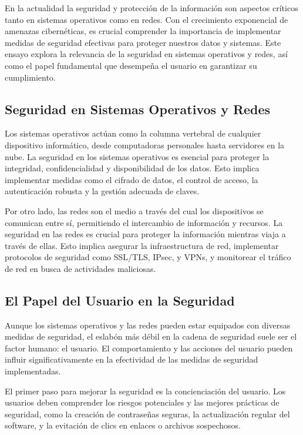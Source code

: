 \documentclass[12pt, a4paper]{article} %
\begin{document}
En la actualidad la seguridad y protección de la información son aspectos críticos tanto en sistemas operativos como en redes. Con el crecimiento exponencial de amenazas cibernéticas, es crucial comprender la importancia de implementar medidas de seguridad efectivas para proteger nuestros datos y sistemas. Este ensayo explora la relevancia de la seguridad en sistemas operativos y redes, así como el papel fundamental que desempeña el usuario en garantizar su cumplimiento.

\subsection{Seguridad en Sistemas Operativos y Redes}

Los sistemas operativos actúan como la columna vertebral de cualquier dispositivo informático, desde computadoras personales hasta servidores en la nube. La seguridad en los sistemas operativos es esencial para proteger la integridad, confidencialidad y disponibilidad de los datos. Esto implica implementar medidas como el cifrado de datos, el control de acceso, la autenticación robusta y la gestión adecuada de claves.

Por otro lado, las redes son el medio a través del cual los dispositivos se comunican entre sí, permitiendo el intercambio de información y recursos. La seguridad en las redes es crucial para proteger la información mientras viaja a través de ellas. Esto implica asegurar la infraestructura de red, implementar protocolos de seguridad como SSL/TLS, IPsec, y VPNs, y monitorear el tráfico de red en busca de actividades maliciosas.

\subsection{El Papel del Usuario en la Seguridad}

Aunque los sistemas operativos y las redes pueden estar equipados con diversas medidas de seguridad, el eslabón más débil en la cadena de seguridad suele ser el factor humano: el usuario. El comportamiento y las acciones del usuario pueden influir significativamente en la efectividad de las medidas de seguridad implementadas.

El primer paso para mejorar la seguridad es la concienciación del usuario. Los usuarios deben comprender los riesgos potenciales y las mejores prácticas de seguridad, como la creación de contraseñas seguras, la actualización regular del software, y la evitación de clics en enlaces o archivos sospechosos.
\end{document}
